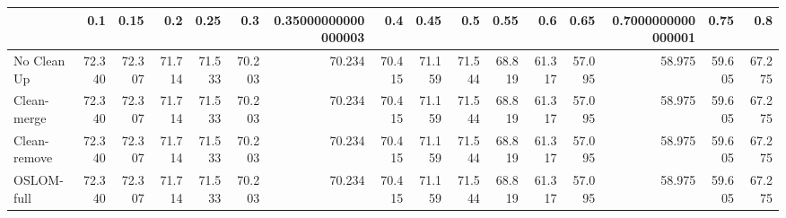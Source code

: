 \begin{tabular}{lrrrrrrrrrrrrrrr}
\toprule
{} &    0.1 &   0.15 &    0.2 &   0.25 &    0.3 & 0.35000000000000003 &    0.4 &   0.45 &    0.5 &   0.55 &    0.6 &   0.65 & 0.7000000000000001 &   0.75 &    0.8 \\
\midrule
No Clean Up  & 72.340 & 72.307 & 71.714 & 71.533 & 70.203 &              70.234 & 70.415 & 71.159 & 71.544 & 68.819 & 61.317 & 57.095 &             58.975 & 59.605 & 67.275 \\
Clean-merge  & 72.340 & 72.307 & 71.714 & 71.533 & 70.203 &              70.234 & 70.415 & 71.159 & 71.544 & 68.819 & 61.317 & 57.095 &             58.975 & 59.605 & 67.275 \\
Clean-remove & 72.340 & 72.307 & 71.714 & 71.533 & 70.203 &              70.234 & 70.415 & 71.159 & 71.544 & 68.819 & 61.317 & 57.095 &             58.975 & 59.605 & 67.275 \\
OSLOM-full   & 72.340 & 72.307 & 71.714 & 71.533 & 70.203 &              70.234 & 70.415 & 71.159 & 71.544 & 68.819 & 61.317 & 57.095 &             58.975 & 59.605 & 67.275 \\
\bottomrule
\end{tabular}
